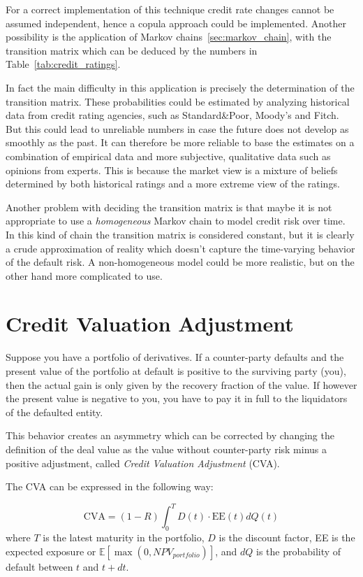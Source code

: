 For a correct implementation of this technique credit rate changes cannot be assumed independent, hence a copula approach could be implemented.
Another possibility is the application of Markov chains~\ref{sec:markov_chain}, with the transition matrix which can be deduced by the numbers in Table~\ref{tab:credit_ratings}.

In fact the main difficulty in this application is precisely the determination of the transition matrix. These probabilities could be estimated by analyzing historical data from credit rating agencies, such as Standard\&Poor, Moody's and Fitch. But this could lead to unreliable numbers in case the future does not develop as smoothly as the past. It can therefore be more reliable to base the estimates on a combination of empirical data and more subjective, qualitative data such as opinions from experts. This is because the market view is a mixture of beliefs determined by both historical ratings and a more extreme view of the ratings. 

Another problem with deciding the transition matrix is that maybe it is not appropriate to use a \emph{homogeneous} Markov chain to model credit risk over time. In this kind of chain the transition matrix is considered constant, but it is clearly a crude approximation of reality which doesn't capture the time-varying behavior of the default risk. A non-homogeneous model could be more realistic, but on the other hand more complicated to use. 

\section{Credit Valuation Adjustment}
\label{credit-valuation-adjustment}

Suppose you have a portfolio of derivatives. If a counter-party defaults and the present value of the portfolio at default is positive to the surviving party (you), then the actual gain is only given by the recovery fraction of the value. If however the present value is negative to you, you have to pay it in full to the liquidators of the defaulted entity.

This behavior creates an asymmetry which can be corrected by changing the definition of the deal value as the value without counter-party risk minus a positive adjustment, called \emph{Credit Valuation Adjustment} (CVA).

The CVA can be expressed in the following way:

\begin{equation}
\text{CVA} = (1-R) \int_0^T D(t) \cdot \textrm{EE}(t) dQ(t)
\label{eq:cva}
\end{equation}
where $T$ is the latest maturity in the portfolio, $D$ is the discount factor, EE is the expected exposure or $\mathbb{E}[\max(0, NPV_{portfolio})]$, and $dQ$ is the probability of default between $t$ and $t+dt$.

